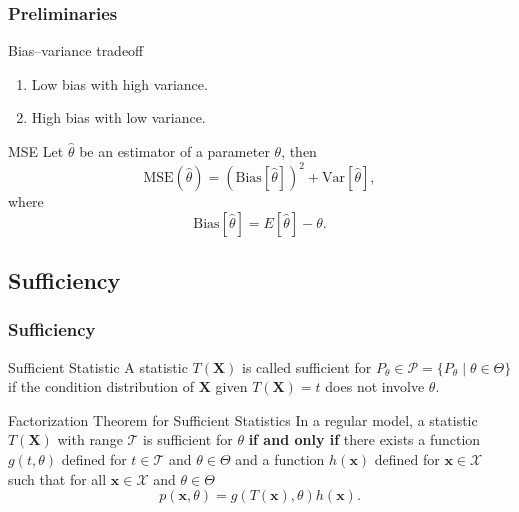 \documentclass[serif,mathserif,professionalfont]{beamer}
\begin{document}
\begin{frame}
	
	\frametitle{Preliminaries}
	
	\begin{block}{Bias–variance tradeoff}
		\begin{enumerate}
			\item Low bias with high variance.
			\item High bias with low variance.
		\end{enumerate}
	\end{block}

	\begin{block}{MSE}
		Let $ \widehat{\theta} $ be an estimator of a parameter $ \theta $, then
		\begin{equation*}
		\text{MSE}\left(\widehat{\theta} \right) = \left(\text{Bias}\left[\widehat{\theta} \right] \right)^2 + \text{Var}\left[\widehat{\theta} \right],
		\end{equation*}
		where
		\begin{equation*}
		\text{Bias}\left[\widehat{\theta} \right] = E\left[\widehat{\theta} \right] - \theta.
		\end{equation*}
	\end{block}
	
\end{frame}



\subsection{Sufficiency}

\begin{frame}
	
	\frametitle{Sufficiency}
	
	\begin{block}{Sufficient Statistic}
		A statistic $ T\left(\bm{X} \right) $ is called sufficient for $ P_{\theta} \in \mathcal{P} = \{P_{\theta} \; | \; \theta \in \Theta \} $ if the condition distribution of $ \bm{X} $ given $ T\left(\bm{X} \right) = t $ does not involve $ \theta $.
	\end{block}

	\begin{block}{Factorization Theorem for Sufficient Statistics}
		In a regular model, a statistic $ T\left(\bm{X} \right) $ with range $ \mathcal{T} $ is sufficient for $ \theta $ \textbf{if and only if} there exists a function $ g\left(t, \theta \right) $ defined for $ t \in \mathcal{T} $ and $ \theta \in \Theta $ and a function $ h\left(\bm{x} \right) $ defined for $ \bm{x} \in \mathcal{X} $ such that for all $ \bm{x} \in \mathcal{X} $ and $ \theta \in \Theta $
		\begin{equation*}
		p\left(\bm{x}, \theta \right) = g\left(T\left(\bm{x} \right), \theta \right) h\left(\bm{x} \right).
		\end{equation*}
	\end{block}
	
\end{frame}
\end{document}
